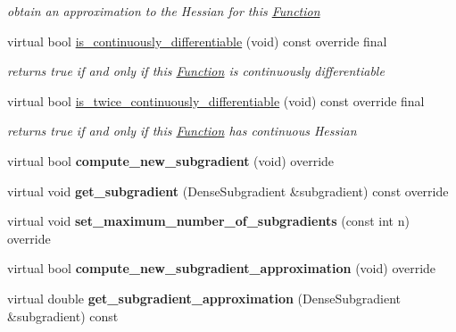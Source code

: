 \begin{Indent}
\begin{DoxyCompactItemize}
\begin{DoxyCompactList}\small\item\em obtain an approximation to the Hessian for this \mbox{\hyperlink{class_s_m_spp__di__unipi__it_1_1_function}{Function}} \end{DoxyCompactList}\item 
virtual bool \mbox{\hyperlink{class_s_m_spp__di__unipi__it_1_1_d_quad_function_ae8dc9a7225895704afe3802754f4fd75}{is\+\_\+continuously\+\_\+differentiable}} (void) const override final
\begin{DoxyCompactList}\small\item\em returns true if and only if this \mbox{\hyperlink{class_s_m_spp__di__unipi__it_1_1_function}{Function}} is continuously differentiable \end{DoxyCompactList}\item 
virtual bool \mbox{\hyperlink{class_s_m_spp__di__unipi__it_1_1_d_quad_function_a272aecba91401ca432dfa79ad6091c3e}{is\+\_\+twice\+\_\+continuously\+\_\+differentiable}} (void) const override final
\begin{DoxyCompactList}\small\item\em returns true if and only if this \mbox{\hyperlink{class_s_m_spp__di__unipi__it_1_1_function}{Function}} has continuous Hessian \end{DoxyCompactList}\item 
\mbox{\label{class_s_m_spp__di__unipi__it_1_1_d_quad_function_a85368281605c78cb95e9affb56e9f704}} 
virtual bool {\bfseries compute\+\_\+new\+\_\+subgradient} (void) override
\item 
\mbox{\label{class_s_m_spp__di__unipi__it_1_1_d_quad_function_aa663deeb54cf70a2b9094f8dbfdbe5a4}} 
virtual void {\bfseries get\+\_\+subgradient} (Dense\+Subgradient \&subgradient) const override
\item 
\mbox{\label{class_s_m_spp__di__unipi__it_1_1_d_quad_function_af6d3eebde0c34b8ce1e01e8f9748a5f6}} 
virtual void {\bfseries set\+\_\+maximum\+\_\+number\+\_\+of\+\_\+subgradients} (const int n) override
\item 
\mbox{\label{class_s_m_spp__di__unipi__it_1_1_d_quad_function_a25b6ed094a7bcede578acb4ef9d0031c}} 
virtual bool {\bfseries compute\+\_\+new\+\_\+subgradient\+\_\+approximation} (void) override
\item 
\mbox{\label{class_s_m_spp__di__unipi__it_1_1_d_quad_function_a11551103a619065418d9ac93db90b2f4}} 
virtual double {\bfseries get\+\_\+subgradient\+\_\+approximation} (Dense\+Subgradient \&subgradient) const
\end{DoxyCompactItemize}
\end{Indent}
